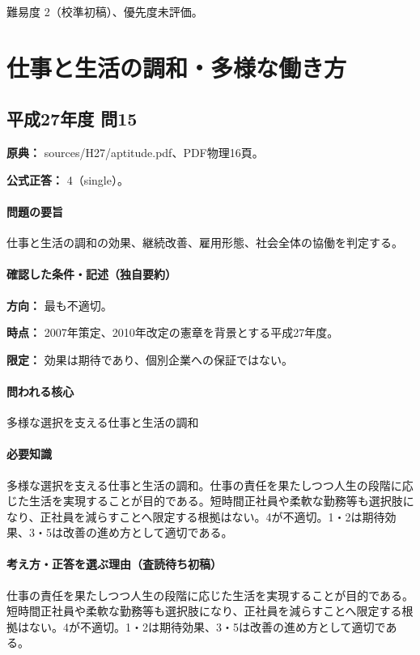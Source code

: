 \par 難易度 2（校準初稿）、優先度未評価。

\section{仕事と生活の調和・多様な働き方}

\subsection{平成27年度 問15}
\label{q:h27-reg-apt-15}

\noindent\textbf{原典：} sources/H27/aptitude.pdf、PDF物理16頁。

\textbf{公式正答：} 4（single）。

\paragraph{問題の要旨} 仕事と生活の調和の効果、継続改善、雇用形態、社会全体の協働を判定する。

\paragraph{確認した条件・記述（独自要約）}\mbox{}\par

\noindent\textbf{方向：} 最も不適切。\par

\noindent\textbf{時点：} 2007年策定、2010年改定の憲章を背景とする平成27年度。\par

\noindent\textbf{限定：} 効果は期待であり、個別企業への保証ではない。\par

\paragraph{問われる核心} 多様な選択を支える仕事と生活の調和

\paragraph{必要知識} 多様な選択を支える仕事と生活の調和。仕事の責任を果たしつつ人生の段階に応じた生活を実現することが目的である。短時間正社員や柔軟な勤務等も選択肢になり、正社員を減らすことへ限定する根拠はない。4が不適切。1・2は期待効果、3・5は改善の進め方として適切である。

\paragraph{考え方・正答を選ぶ理由（査読待ち初稿）} 仕事の責任を果たしつつ人生の段階に応じた生活を実現することが目的である。短時間正社員や柔軟な勤務等も選択肢になり、正社員を減らすことへ限定する根拠はない。4が不適切。1・2は期待効果、3・5は改善の進め方として適切である。

